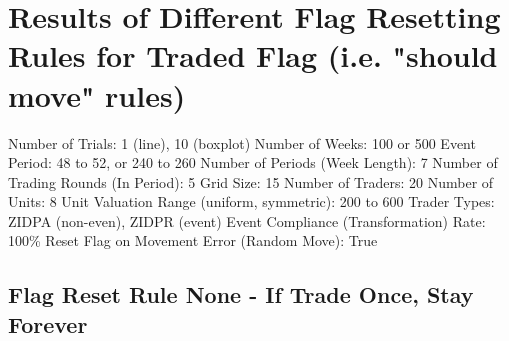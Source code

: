\documentclass{article}%
\begin{document}
%
\normalsize%
\section{Results of Different Flag Resetting Rules for Traded Flag (i.e. "should move" rules)}%
\label{sec:ResultsofDifferentFlagResettingRulesforTradedFlag(i.e.shouldmoverules)}%
Number of Trials: 1 (line), 10 (boxplot)\newline%
%
Number of Weeks: 100 or 500\newline%
%
Event Period: 48 to 52, or 240 to 260\newline%
%
Number of Periods (Week Length): 7\newline%
%
Number of Trading Rounds (In Period): 5\newline%
%
Grid Size: 15\newline%
%
Number of Traders: 20\newline%
%
Number of Units: 8\newline%
%
Unit Valuation Range (uniform, symmetric): 200 to 600\newline%
%
Trader Types: ZIDPA (non{-}even), ZIDPR (event)\newline%
%
Event Compliance (Transformation) Rate: 100\%\newline%
%
Reset Flag on Movement Error (Random Move): True\newline%
%
\clearpage%
\subsection{Flag Reset Rule None {-} If Trade Once, Stay Forever}%
\label{subsec:FlagResetRuleNone{-}IfTradeOnce,StayForever}%
\end{document}
